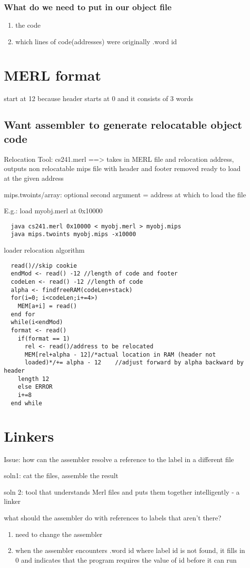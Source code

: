 \documentclass[11pt]{amsart}
\begin{document}
\subsubsection{What do we need to put in our object file}
\begin{enumerate}
  \item the code
  \item which lines of code(addresses) were originally .word id
\end{enumerate}
\section{MERL format}
\par start at 12 because header starts at 0 and it consists of 3 words
\subsection{Want assembler to generate relocatable object code}
\par Relocation Tool: cs241.merl ==> takes in MERL file and relocation address,
outputs non relocatable mips file with header and footer removed ready to load
at the given address
\par mips.twoints/array: optional second argument = address at which to load
the file
\par E.g.: load myobj.merl at 0x10000
\begin{verbatim}
  java cs241.merl 0x10000 < myobj.merl > myobj.mips
  java mips.twoints myobj.mips -x10000
\end{verbatim}
\par loader relocation algorithm
\begin{verbatim}
  read()//skip cookie
  endMod <- read() -12 //length of code and footer
  codeLen <- read() -12 //length of code
  alpha <- findfreeRAM(codeLen+stack)
  for(i=0; i<codeLen;i+=4>)
    MEM[a+i] = read()
  end for
  while(i<endMod)
  format <- read()
    if(format == 1)
      rel <- read()/address to be relocated
      MEM[rel+alpha - 12]/*actual location in RAM (header not
      loaded)*/+= alpha - 12    //adjust forward by alpha backward by header
    length 12
    else ERROR
    i+=8
  end while
\end{verbatim}
\section{Linkers}
\par Issue: how can the assembler resolve a reference to the label in a
different file
\par soln1: cat the files, assemble the result
\par soln 2: tool that understands Merl files and puts them together
intelligently - a linker
\par what should the assembler do with references to labels that aren't there?
\begin{enumerate}
\item need to change the assembler
\item when the assembler encounters .word id where label id is not found, it
  fills in 0 and indicates that the program requires the value of id before it
  can run
\end{enumerate}
\end{document}
